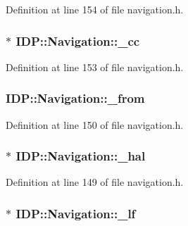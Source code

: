 Definition at line 154 of file navigation.h.

\hypertarget{classIDP_1_1Navigation_a49b7088c125ef5c7a5227e2242b84947}{
\subsubsection[{\_\-cc}]{$\ast$ {\bf IDP::Navigation::\_\-cc}}}
\label{classIDP_1_1Navigation_a49b7088c125ef5c7a5227e2242b84947}


Definition at line 153 of file navigation.h.

\hypertarget{classIDP_1_1Navigation_a7ce2cbd9199af73b36d4e887282a38e6}{
\subsubsection[{\_\-from}]{ {\bf IDP::Navigation::\_\-from}}}
\label{classIDP_1_1Navigation_a7ce2cbd9199af73b36d4e887282a38e6}


Definition at line 150 of file navigation.h.

\hypertarget{classIDP_1_1Navigation_a640c36341bdf1e2d4ef194ad3aac9773}{
\subsubsection[{\_\-hal}]{$\ast$ {\bf IDP::Navigation::\_\-hal}}}
\label{classIDP_1_1Navigation_a640c36341bdf1e2d4ef194ad3aac9773}


Definition at line 149 of file navigation.h.

\hypertarget{classIDP_1_1Navigation_a61d775069513302fa6b23c64da7a6ec4}{
\subsubsection[{\_\-lf}]{$\ast$ {\bf IDP::Navigation::\_\-lf}}}
\label{classIDP_1_1Navigation_a61d775069513302fa6b23c64da7a6ec4}



